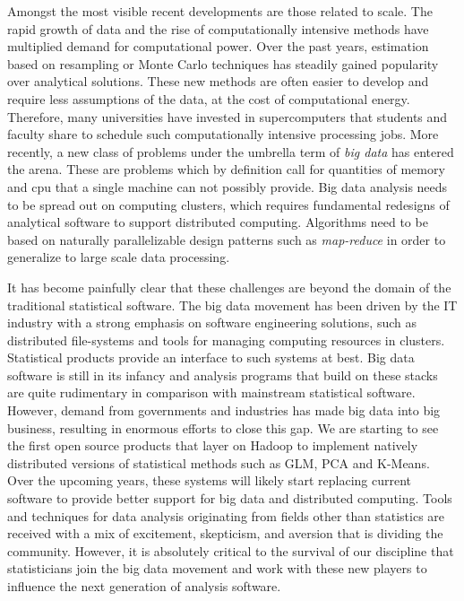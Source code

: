 Amongst the most visible recent developments are those related to scale. The rapid growth of data and the rise of computationally intensive methods have multiplied demand for computational power. Over the past years, estimation based on resampling or Monte Carlo techniques %
has steadily gained popularity over analytical solutions. 
These new methods are often easier to develop and require less assumptions of the data, at the cost of computational energy.
Therefore, many universities have invested in supercomputers that students and faculty share to schedule such computationally intensive processing jobs. More recently, a new class of problems under the umbrella term of \emph{big data} has entered the arena. These are problems which by definition call for quantities of memory and cpu that a single machine can not possibly provide. Big data analysis needs to be spread out on computing clusters, which requires fundamental redesigns of analytical software to support distributed computing. Algorithms need to be based on naturally parallelizable design patterns such as \emph{map-reduce} \citep{dean2004mapreduce} in order to generalize to large scale data processing. 

It has become painfully clear that these challenges are beyond the domain of the traditional statistical software. The big data movement has been driven by the IT industry with a strong emphasis on software engineering solutions, such as distributed file-systems and tools for managing computing resources in clusters. Statistical products provide an interface to such systems at best. Big data software is still in its infancy and analysis programs that build on these stacks are quite rudimentary in comparison with mainstream statistical software. However, demand from governments and industries has made big data into big business, resulting in enormous efforts to close this gap. We are starting to see the first open source products 
that layer on Hadoop to implement natively distributed versions of statistical methods such as GLM, PCA and K-Means. Over the upcoming years, these systems will likely start replacing current software to provide better support for big data and distributed computing. 
Tools and techniques for data analysis originating from fields other than statistics are received with a mix of excitement, skepticism, and aversion that is dividing the community. However, it is absolutely critical to the survival of our discipline that statisticians join the big data movement and work with these new players to influence the next generation of analysis software.


